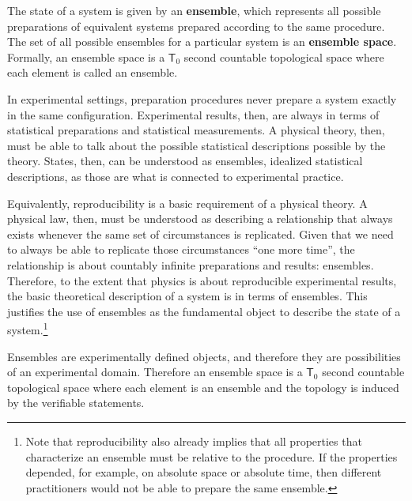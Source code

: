 \begin{mathSection}
	\begin{axiom} 
		The state of a system is given by an \textbf{ensemble}, which represents all possible preparations of equivalent systems prepared according to the same procedure. The set of all possible ensembles for a particular system is an \textbf{ensemble space}. Formally, an ensemble space is a $\mathsf{T}_0$ second countable topological space where each element is called an ensemble.
	\end{axiom}
	
	\begin{justification}
		In experimental settings, preparation procedures never prepare a system exactly in the same configuration. Experimental results, then, are always in terms of statistical preparations and statistical measurements. A physical theory, then, must be able to talk about the possible statistical descriptions possible by the theory. States, then, can be understood as ensembles, idealized statistical descriptions, as those are what is connected to experimental practice.
		
		Equivalently, reproducibility is a basic requirement of a physical theory. A physical law, then, must be understood as describing a relationship that always exists whenever the same set of circumstances is replicated. Given that we need to always be able to replicate those circumstances ``one more time'', the relationship is about countably infinite preparations and results: ensembles. Therefore, to the extent that physics is about reproducible experimental results, the basic theoretical description of a system is in terms of ensembles. This justifies the use of ensembles as the fundamental object to describe the state of a system.\footnote{Note that reproducibility also already implies that all properties that characterize an ensemble must be relative to the procedure. If the properties depended, for example, on absolute space or absolute time, then different practitioners would not be able to prepare the same ensemble.}
		
		Ensembles are experimentally defined objects, and therefore they are possibilities of an experimental domain. Therefore an ensemble space is a $\mathsf{T}_0$ second countable topological space where each element is an ensemble and the topology is induced by the verifiable statements.
	\end{justification}
\end{mathSection}

